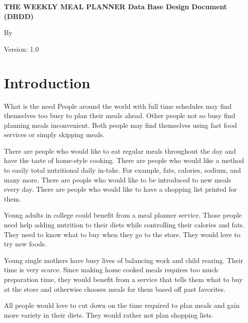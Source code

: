 \documentclass[a4paper,10pt,toc=graduated]{article}
\author{\docauthor}
\title{\doctitle}
\newcommand*\docauthor{
Josh Gillham
\\
Randy Mangel
\\
Sann Voun
\\
Daniel Eason
\\
}
\newcommand*\doctitle{The Weekly Meal Planner}
\begin{document}
\vspace*{\fill}

\begin{center}
\begin{em}
\bf
\huge
\noindent
\uppercase{
\doctitle
}
Data Base Design Document (DBDD)

\end{em}
\end{center}
\vspace{\fill}

\begin{center}
\tiny
By

\begin{em}
\small
\noindent
\uppercase{
\docauthor
}
\end{em}
\end{center}
\vspace{\fill}
Version: 1.0


\newpage
\setcounter{tocdepth}{2}
\tableofcontents
\newpage
\section{Introduction}
\begin{mySubsection}{What is the need}
People around the world with full time schedules may find themselves too busy
to plan their meals ahead.
Other people not so busy find planning meals inconvenient.
Both people may find themselves using fast food services
or simply skipping meals.

There are people who would like to eat regular meals throughout the day
and have the taste of home-style cooking.
There are people who would like a method to easily total nutritional daily in-take.
For example, fats, calories, sodium, and many more.
There are people who would like to be introduced to new meals every day.
There are people who would like to have a shopping list printed for them.

Young adults in college could benefit from a meal planner service.
Those people need help adding nutrition to their diets
while controlling their calories and fats.
They need to know what to buy when they go to the store.
They would love to try new foods.

Young single mothers have busy lives of balancing work and child rearing.
Their time is very scarce.
Since making home cooked meals requires too much preparation time,
they would benefit from a service
that tells them what to buy at the store
and otherwise chooses meals for them based off past favorites.

All people would love to cut down on the time required to plan meals
and gain more variety in their diets.
They would rather not plan shopping lists.
\end{mySubsection}
\end{document}
